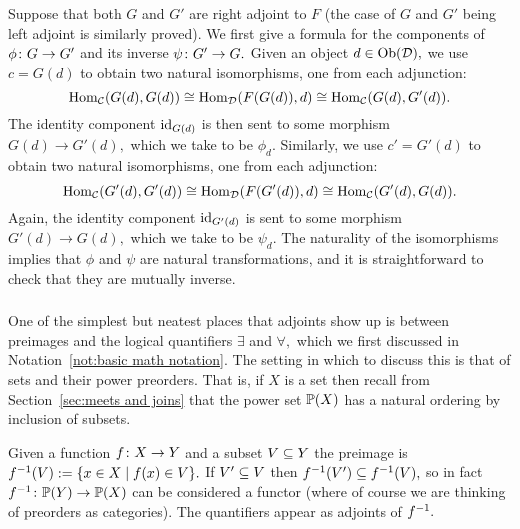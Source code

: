 \documentclass[CT4S-EN-RU]{subfiles}
\begin{document}
\begin{proofENG}
Suppose that both $G$ and $G'$ are right adjoint to $F$ (the case of $G$ and $G'$ being left adjoint is similarly proved). We first give a formula for the components of $\phi\taking G\to G'$ and its inverse $\psi\taking G'\to G.$ Given an object $d\in\Ob(\mcD),$ we use $c=G(d)$ to obtain two natural isomorphisms, one from each adjunction: 
$$\Hom_\mcC(G(d),G(d))\iso\Hom_\mcD(F(G(d)),d)\iso\Hom_\mcC(G(d),G'(d)).$$
The identity component $\id_{G(d)}$ is then sent to some morphism $G(d)\to G'(d),$ which we take to be $\phi_d.$ Similarly, we use $c'=G'(d)$ to obtain two natural isomorphisms, one from each adjunction:
$$\Hom_\mcC(G'(d),G'(d))\iso\Hom_\mcD(F(G'(d)),d)\iso\Hom_\mcC(G'(d),G(d)).$$
Again, the identity component $\id_{G'(d)}$ is sent to some morphism $G'(d)\to G(d),$ which we take to be $\psi_d.$ The naturality of the isomorphisms implies that $\phi$ and $\psi$ are natural transformations, and it is straightforward to check that they are mutually inverse.
\end{proofENG}

\begin{proofRUS}
\end{proofRUS}


\subsubsection{}

\begin{blockENG}
One of the simplest but neatest places that adjoints show up is between preimages and the logical quantifiers $\exists$ and $\forall,$ which we first discussed in Notation~\ref{not:basic math notation}.  The setting in which to discuss this is that of sets and their power preorders. That is, if $X$ is a set then recall from Section~\ref{sec:meets and joins} that the power set $\PP(X)$ has a natural ordering by inclusion of subsets. 
\end{blockENG}

\begin{blockRUS}
\end{blockRUS}

\begin{blockENG}
Given a function $f\taking X\to Y$ and a subset $V\ss Y$ the preimage is $f^\m1(V):=\{x\in X\|f(x)\in V\}.$ If $V'\ss V$ then $f^\m1(V')\ss f^\m1(V),$ so in fact $f^\m1\taking\PP(Y)\to\PP(X)$ can be considered a functor (where of course we are thinking of preorders as categories). The quantifiers appear as adjoints of $f^\m1.$
\end{blockENG}
\end{document}
